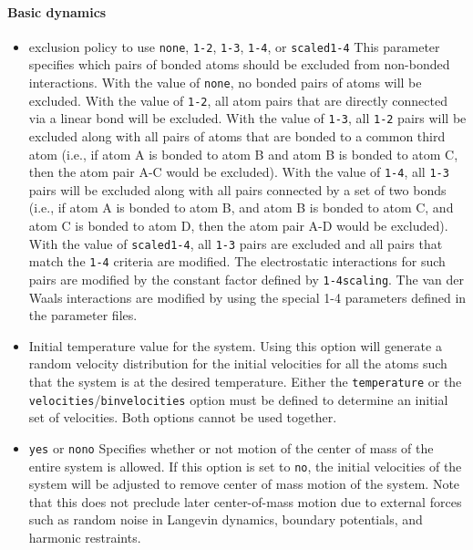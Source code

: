 \paragraph{Basic dynamics}

\begin{itemize}
\item
{}%
{exclusion policy to use}%
{\verb!none!, \verb!1-2!, \verb!1-3!, \verb!1-4!, or \verb!scaled1-4!}%
{\label{param:exclude}
This parameter specifies which pairs of bonded atoms should
be excluded from non-bonded
interactions.  With the value of \verb!none!, no bonded pairs of atoms 
will be excluded.  With the value of \verb!1-2!, all atom pairs that
are directly connected via a linear bond will be excluded.  With the
value of \verb!1-3!, all \verb!1-2! pairs will be excluded along with
all pairs of atoms that are bonded to a common
third atom (i.e., if atom A is bonded to atom B and atom B is bonded
to atom C, then the atom pair A-C would be excluded).
With the value of \verb!1-4!, all \verb!1-3! pairs will be excluded along
with all pairs connected by a set of two bonds (i.e., if atom A is bonded
to atom B, and atom B is bonded to atom C, and atom C is bonded to
atom D, then the atom pair A-D would be excluded).  With the value
of \verb!scaled1-4!, all \verb!1-3! pairs are excluded and all pairs
that match the \verb!1-4! criteria are modified.  The electrostatic
interactions for such pairs are modified by the constant factor
defined by \verb!1-4scaling!.  
The van der Waals interactions are modified
by using the special 1-4 parameters defined in the parameter files.}

\item
{}
{\label{param:temperature}
Initial temperature value for the system.  
Using this option will generate a random
velocity distribution for the initial velocities 
for all the atoms such that the system 
is at the desired temperature.  
Either the \verb!temperature! 
or the \verb!velocities!/\verb!binvelocities!
option must be defined to determine an initial set of velocities.  
Both options cannot be used together.}

\item
{}%
{\verb!yes! or \verb!no!}{\verb!no!}
{
Specifies whether or not motion of 
the center of mass of the entire system is allowed.  
If this option is set to \verb!no!, the initial velocities of the system 
will be adjusted to remove center of mass motion of the system.
Note that this does not preclude later center-of-mass motion due to 
external forces such as random noise in Langevin dynamics, boundary
potentials, and harmonic restraints.}


\end{itemize}
